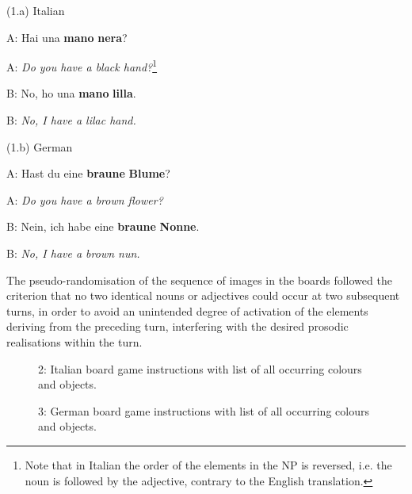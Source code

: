 (1.a) Italian

A: Hai una \textbf{mano} \textbf{nera}?

A: \textit{Do you have a black hand?}\footnote{Note that in Italian the order of the elements in the NP is reversed, i.e. the noun is followed by the adjective, contrary to the English translation.}

B: No, ho una \textbf{mano} \textbf{lilla}.

B: \textit{No, I have a lilac hand.}

(1.b) German

A: Hast du eine \textbf{braune} \textbf{Blume}?

A: \textit{Do you have a brown flower?}

B: Nein, ich habe eine \textbf{braune} \textbf{Nonne}.

B: \textit{No, I have a brown nun.}

The pseudo-randomisation of the sequence of images in the boards followed the criterion that no two identical nouns or adjectives could occur at two subsequent turns, in order to avoid an unintended degree of activation of the elements deriving from the preceding turn, interfering with the desired prosodic realisations within the turn.

  
 

\begin{stylecaption}\begin{figure}
\caption{2: Italian board game instructions with list of all occurring colours and objects.}
\label{fig:key:2}
\end{figure}\end{stylecaption}

  
 

\begin{stylecaption}\begin{figure}
\caption{3: German board game instructions with list of all occurring colours and objects.}
\label{fig:key:2}
\end{figure}\end{stylecaption}

